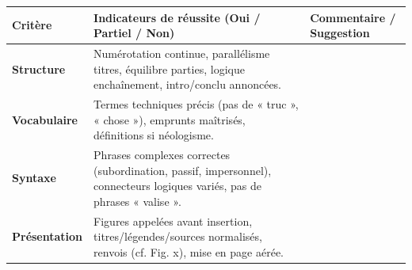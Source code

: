 \documentclass[11pt]{article}
\begin{document}
\begin{center}
\begin{tabularx}{\linewidth}{|l|X|X|}\hline
\rowcolor{popblueL}
\textbf{Critère} & \textbf{Indicateurs de réussite (Oui / Partiel / Non)} & \textbf{Commentaire / Suggestion} \\ \hline
\textbf{Structure} & Numérotation continue, parallélisme titres, équilibre parties, logique enchaînement, intro/conclu annoncées. & \\ \hline
\textbf{Vocabulaire} & Termes techniques précis (pas de « truc », « chose »), emprunts maîtrisés, définitions si néologisme. & \\ \hline
\textbf{Syntaxe} & Phrases complexes correctes (subordination, passif, impersonnel), connecteurs logiques variés, pas de phrases « valise ». & \\ \hline
\textbf{Présentation} & Figures appelées avant insertion, titres/légendes/sources normalisés, renvois (cf. Fig. x), mise en page aérée. & \\ \hline
\end{tabularx}
\end{center}
\end{document}
